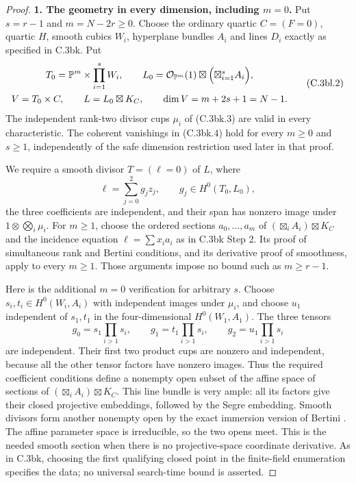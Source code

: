\begin{proof}
\textbf{1. The geometry in every dimension, including $m=0$.}
Put $s=r-1$ and $m=N-2r\ge0$. Choose the ordinary quartic $C=(F=0)$,
quartic $H$, smooth cubics $W_i$, hyperplane bundles $A_i$ and lines
$D_i$ exactly as specified in C.3bk. Put
\[
 \begin{gathered}
 T_0=\mathbb P^m\times\prod_{i=1}^sW_i,\qquad
 L_0=\mathcal O_{\mathbb P^m}(1)\boxtimes\Bigl(\boxtimes_{i=1}^s A_i\Bigr),\\
 V=T_0\times C,
 \qquad L=L_0\boxtimes K_C,
 \qquad \dim V=m+2s+1=N-1.
 \end{gathered}
 \tag{C.3bl.2}
\]
The independent rank-two divisor cups $\mu_i$ of (C.3bk.3) are
valid in every characteristic. The coherent vanishings in
(C.3bk.4) hold for every $m\ge0$ and $s\ge1$, independently of the
safe dimension restriction used later in that proof.

We require a smooth divisor $T=(\ell=0)$ of $L$, where
\[
 \ell=\sum_{j=0}^2g_jz_j,
 \qquad g_j\in H^0(T_0,L_0),
\]
the three coefficients are independent, and their span has nonzero
image under $1\otimes\bigotimes_i\mu_i$.
For $m\ge1$, choose the ordered sections $a_0,\ldots,a_m$ of
$(\boxtimes_iA_i)\boxtimes K_C$ and the incidence equation
$\ell=\sum x_i a_i$ as in C.3bk Step 2.
Its proof of simultaneous rank and Bertini conditions, and its
derivative proof of smoothness, apply to every $m\ge1$.
Those arguments impose no bound such as $m\ge r-1$.

Here is the additional $m=0$ verification for arbitrary $s$.
Choose $s_i,t_i\in H^0(W_i,A_i)$ with independent images under
$\mu_i$, and choose $u_1$ independent of $s_1,t_1$ in the
four-dimensional $H^0(W_1,A_1)$. The three tensors
\[
 g_0=s_1\prod_{i>1}s_i,\qquad
 g_1=t_1\prod_{i>1}s_i,\qquad
 g_2=u_1\prod_{i>1}s_i
 \tag{C.3bl.3}
\]
are independent. Their first two product cups are nonzero and
independent, because all the other tensor factors have nonzero
images. Thus the required coefficient conditions define a nonempty
open subset of the affine space of sections of
$(\boxtimes_iA_i)\boxtimes K_C$. This line bundle is very ample:
all its factors give their closed projective embeddings, followed
by the Segre embedding. Smooth divisors form another nonempty open
by the exact immersion version of Bertini
\citep[Lemma 33.47.3, Tag 0FD6]{D_StacksBertiniUniformHigher}.
The affine parameter space is irreducible, so the two opens meet.
This is the needed smooth section when there is no projective-space
coordinate derivative. As in C.3bk, choosing the first qualifying
closed point in the finite-field enumeration specifies the data;
no universal search-time bound is asserted.


\end{proof}
